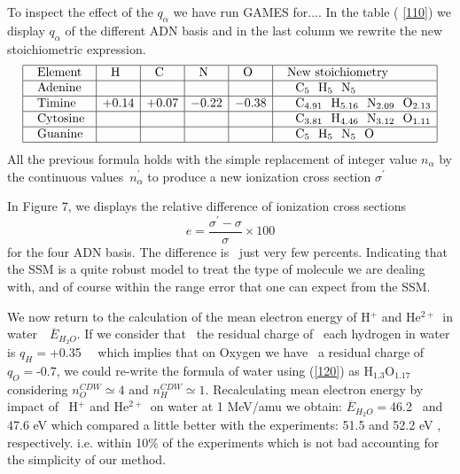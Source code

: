 \documentclass[preprint,showpacs,pra]{revtex4}
\begin{document}
To inspect the effect of the $q_{\alpha }$ we have run GAMES for.... In the
table ( \ref{110}) we display $q_{\alpha }$ of the different ADN basis and
in the last column we rewrite the new stoichiometric expression. 
\begin{equation}
\begin{array}{|l|l|l|l|l|l|}
\hline
\text{Element\ \ } & \text{H} & \text{C} & \text{N} & \text{O} & \text{New\
stoichiometry} \\ \hline
\text{Adenine} &  &  &  &  & \ \ \text{C}_{5}\text{H}_{5}\text{N}_{5} \\ 
\hline
\text{Timine} & +0.14 & +0.07 & -0.22 & -0.38 & \ \text{\ C}_{4.91}\text{H}%
_{5.16}\text{N}_{2.09}\text{O}_{2.13} \\ \hline
\text{Cytosine} &  &  &  &  & \ \text{\ C}_{3.81}\text{H}_{4.46}\text{N}%
_{3.12}\text{O}_{1.11} \\ \hline
\text{Guanine} &  &  &  &  & \ \ \text{C}_{5}\text{H}_{5}\text{N}_{5}\text{O}
\\ \hline
\end{array}
\label{110}
\end{equation}%
All the previous formula holds with the simple replacement of integer value $%
n_{\alpha }$ by the continuous values\ $n_{\alpha }^{\prime }$ to produce a
new ionization cross section $\sigma ^{\prime }$

In Figure 7, we displays the relative difference of ionization cross
sections 
\begin{equation}
e=\frac{\sigma ^{\prime }-\sigma }{\sigma }\times 100  \label{120}
\end{equation}%
for the four ADN basis. The difference is \ just very few percents.
Indicating that the SSM is a quite robust model to treat the type of
molecule we are dealing with, and of course within the range error that one
can expect from the SSM.

We now return to the calculation of the mean electron energy of H$^{+}$ and
He$^{2+~}$ in water\ \ $\overline{E}_{H_{2}O}$. If we consider that \ the
residual charge of \ each hydrogen in water is $q_{H}=$+0.35 \ \cite%
{rappe1991}\ which implies that on Oxygen we have \ a residual charge of $%
q_{O}=$-0.7, we could re-write the formula of water using (\ref{120}) as H$%
_{1.3}$O$_{1.17}$ considering $n_{O}^{CDW}\simeq 4$ and $n_{H}^{CDW}\simeq
1. $ Recalculating mean electron energy by impact of \ H$^{+}$ and He$^{2+~}$
on water at 1 MeV/amu we obtain: $\overline{E}_{H_{2}O}=$46.2 \ and 47.6 eV
which compared a little better with the experiments: 51.5 and 52.2 eV \cite%
{pimblott2007}, respectively. i.e. within 10\% of the experiments which is
not bad accounting for the simplicity of our method.
\end{document}

